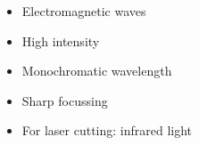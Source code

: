 \begin{frame}
    \begin{itemize}
        \item Electromagnetic waves
        \item High intensity
        \item Monochromatic wavelength
        \item Sharp focussing
        \item For laser cutting: infrared light
    \end{itemize}
\end{frame}